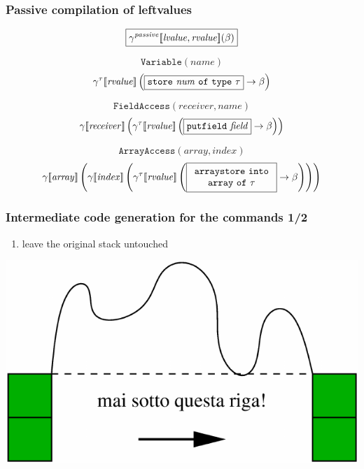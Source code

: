 \documentclass[11pt]{beamer}  %
\begin{document}
\begin{frame}
\frametitle{Passive compilation of leftvalues}

\[
  \boxed{\gamma^{\mathit{passive}}[\![{\mathit{lvalue},\mathit{rvalue}}]\!](\beta)}
\]

\[
    \mathtt{Variable(\mathit{name})}
\]
\[
    \gentwo{\tau}{\mathit{rvalue}}\left(\fbox{$\mathtt{store}\ \mathit{num}\ \mathtt{of\ type\ }\tau$}\to\beta\right)
\]

\vspace*{2ex}
\[
    \mathtt{FieldAccess(\mathit{receiver},\mathit{name})}
\]
\[
    \gen{\mathit{receiver}}\left(
      \gentwo{\tau}{\mathit{rvalue}}\left(\fbox{$\mathtt{putfield}\ \mathit{field}$}\to\beta\right)\right)
\]

\vspace*{2ex}
\[
    \mathtt{ArrayAccess(\mathit{array},\mathit{index})}
\]
\[
    \gamma[\![{\mathit{array}}]\!]\left(\gamma[\![{\mathit{index}}]\!]\left(
      \gamma^{\tau}[\![{\mathit{rvalue}}]\!]\left(\fbox{$\begin{array}{c}
      \mathtt{arraystore\ into}\\
      \mathtt{array\ of}\ \tau
      \end{array}$}\to\beta\right)\right)\right)
\]

\end{frame}

\begin{frame}
\frametitle{Intermediate code generation for the commands 1/2}

\begin{enumerate}
\item leave the original stack untouched
\end{enumerate}

\begin{center}
\includegraphics[scale=0.9]{pictures/russe2.pdf}
\end{center}

\end{frame}
\end{document}
